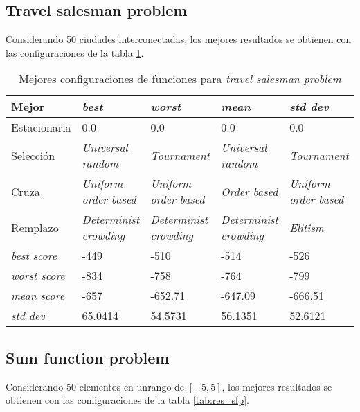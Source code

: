 \subsection{Travel salesman problem}

Considerando 50 ciudades interconectadas,  los mejores resultados se obtienen con las configuraciones de la tabla \ref{tab:res_tsp}.

\begin{table}[h!]
	\centering
	\begin{tabular}{|p{}|p{}|p{}|p{}|p{}|}
		\hline
		\textbf{Mejor} & \textbf{\textit{best}} & \textbf{\textit{worst}} & \textbf{\textit{mean}} & \textbf{\textit{std dev}}  \\ \hline
		Estacionaria & 0.0 & 0.0 & 0.0 & 0.0 \\
		Selección & \textit{Universal random} &\textit{Tournament}  & \textit{Universal random}  & \textit{Tournament}\\
		Cruza & \textit{Uniform order based}&  \textit{Uniform order based} &  \textit{Order based} & \textit{Uniform order based} \\
		Remplazo & \textit{Determinist crowding} &  \textit{Determinist crowding} &  \textit{Determinist crowding}  & \textit{Elitism} \\ \hline
		\textit{best score}& -449 & -510 & -514 &  -526\\
		\textit{worst score}& -834 & -758 & -764 & -799 \\
		\textit{mean score}& -657 & -652.71 & -647.09 & -666.51 \\
		\textit{std dev}& 65.0414 & 54.5731 & 56.1351 & 52.6121 \\ \hline
	\end{tabular}
	\caption{Mejores configuraciones de funciones para \textit{travel salesman problem}}
	\label{tab:res_tsp}
\end{table}

\subsection{Sum function problem}

Considerando 50 elementos en unrango de $[-5,5]$, los mejores resultados se obtienen con las configuraciones de la tabla \ref{tab:res_sfp}.


